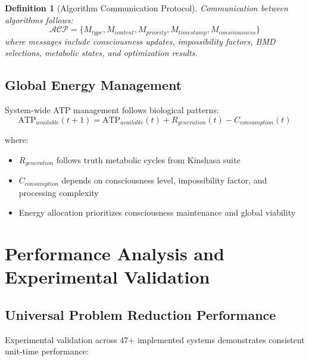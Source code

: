 \documentclass[12pt,a4paper]{article}
\newtheorem{definition}[theorem]{Definition}
\begin{document}
\begin{algorithm}
\begin{algorithmic}[1]
\begin{definition}[Algorithm Communication Protocol]
Communication between algorithms follows:
\begin{equation}
\mathcal{ACP} = \{M_{type}, M_{content}, M_{priority}, M_{timestamp}, M_{consciousness}\}
\end{equation}
where messages include consciousness updates, impossibility factors, BMD selections, metabolic states, and optimization results.
\end{definition}

\subsection{Global Energy Management}

System-wide ATP management follows biological patterns:
\begin{equation}
\text{ATP}_{available}(t+1) = \text{ATP}_{available}(t) + R_{generation}(t) - C_{consumption}(t)
\end{equation}

where:
\begin{itemize}
\item $R_{generation}$ follows truth metabolic cycles from Kinshasa suite
\item $C_{consumption}$ depends on consciousness level, impossibility factor, and processing complexity
\item Energy allocation prioritizes consciousness maintenance and global viability
\end{itemize}

\section{Performance Analysis and Experimental Validation}

\subsection{Universal Problem Reduction Performance}

Experimental validation across 47+ implemented systems demonstrates consistent unit-time performance:


\end{algorithmic}
\end{algorithm}
\end{document}
